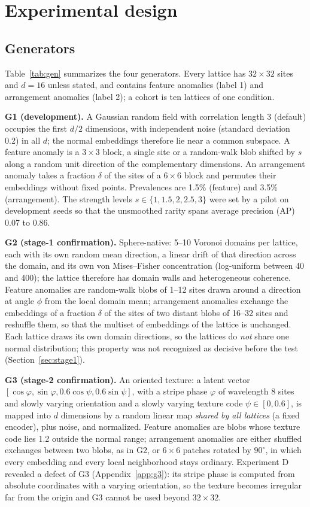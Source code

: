 \documentclass[preprint,review,12pt]{elsarticle}
\begin{document}
\section{Experimental design}
\label{sec:design}
\subsection{Generators}
Table~\ref{tab:gen} summarizes the four generators. Every lattice has $32\times32$ sites and $d=16$ unless stated, and contains feature anomalies (label 1) and arrangement anomalies (label 2); a cohort is ten lattices of one condition.

\textbf{G1 (development).} A Gaussian random field with correlation length 3 (default) occupies the first $d/2$ dimensions, with independent noise (standard deviation 0.2) in all $d$; the normal embeddings therefore lie near a common subspace. A feature anomaly is a $3\times3$ block, a single site or a random-walk blob shifted by $s$ along a random unit direction of the complementary dimensions. An arrangement anomaly takes a fraction $\delta$ of the sites of a $6\times6$ block and permutes their embeddings without fixed points. Prevalences are 1.5\% (feature) and 3.5\% (arrangement). The strength levels $s\in\{1,1.5,2,2.5,3\}$ were set by a pilot on development seeds so that the unsmoothed rarity spans average precision (AP) 0.07 to 0.86.

\textbf{G2 (stage-1 confirmation).} Sphere-native: 5--10 Voronoi domains per lattice, each with its own random mean direction, a linear drift of that direction across the domain, and its own von Mises--Fisher concentration (log-uniform between 40 and 400); the lattice therefore has domain walls and heterogeneous coherence. Feature anomalies are random-walk blobs of 1--12 sites drawn around a direction at angle $\phi$ from the local domain mean; arrangement anomalies exchange the embeddings of a fraction $\delta$ of the sites of two distant blobs of 16--32 sites and reshuffle them, so that the multiset of embeddings of the lattice is unchanged. Each lattice draws its own domain directions, so the lattices do \emph{not} share one normal distribution; this property was not recognized as decisive before the test (Section~\ref{sec:stage1}).

\textbf{G3 (stage-2 confirmation).} An oriented texture: a latent vector $[\cos\varphi,\sin\varphi,0.6\cos\psi,0.6\sin\psi]$, with a stripe phase $\varphi$ of wavelength 8 sites and slowly varying orientation and a slowly varying texture code $\psi\in[0,0.6]$, is mapped into $d$ dimensions by a random linear map \emph{shared by all lattices} (a fixed encoder), plus noise, and normalized. Feature anomalies are blobs whose texture code lies 1.2 outside the normal range; arrangement anomalies are either shuffled exchanges between two blobs, as in G2, or $6\times6$ patches rotated by $90^\circ$, in which every embedding and every local neighborhood stays ordinary. Experiment D revealed a defect of G3 (Appendix~\ref{app:g3}): its stripe phase is computed from absolute coordinates with a varying orientation, so the texture becomes irregular far from the origin and G3 cannot be used beyond $32\times32$.
\end{document}
